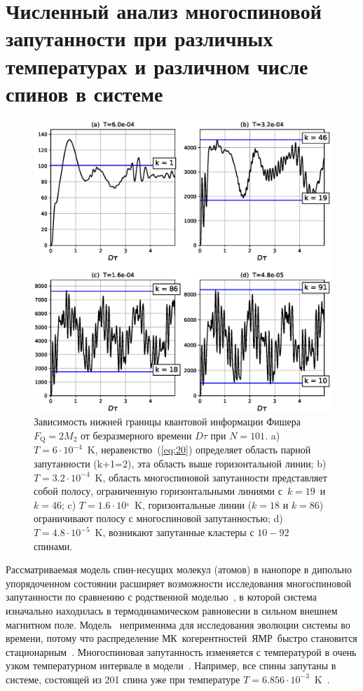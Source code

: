 \documentclass[utf8]{jetp}
\begin{document}
\section{Численный анализ многоспиновой запутанности при различных температурах и различном числе спинов в системе}
\label{sec:5}

\begin{figure}
 	\includegraphics[width=0.95\linewidth]{fisher_low_bound_n101.eps}
	\caption{
	  Зависимость нижней границы  квантовой информации Фишера $F_\mathrm{Q} = 2 M_{2}$
	  от безразмерного времени $D\tau$ при $N=101$.
	  a) $T=6\cdot10^{-4}$~K, неравенство~(\ref{eq:20}) определяет область парной запутанности  (k+1=2), эта область выше горизонтальной линии;
	  b) $T=3.2\cdot10^{-4}$~K, область многоспиновой запутанности представляет собой полосу, ограниченную горизонтальными линиями с~$k=19$~и~$k=46$;
	  c) $T = 1.6\cdot10^{_4}$~K, горизонтальные линии ($k=18$ и $k=86$) ограничивают полосу с многоспиновой запутанностью;
	  d) $T=4.8\cdot10^{-5}$~K, возникают запутанные кластеры с $10-92$ спинами.
	}
	\label{fig:2}
\end{figure}

Рассматриваемая модель спин-несущих молекул (атомов) в нанопоре в дипольно упорядоченном состоянии расширяет возможности исследования многоспиновой запутанности по сравнению с родственной моделью~\cite{Doronin_2019},
в которой система изначально находилась в термодинамическом равновесии в сильном внешнем магнитном поле.
Модель~\cite{Doronin_2019} неприменима для исследования эволюции системы во времени,
потому что распределение МК~когерентностей~ЯМР~быстро становится стационарным~\cite{Doronin_2009}.
Многоспиновая запутанность изменяется с температурой в очень узком температурном интервале в модели~\cite{Doronin_2019}.
Например, все спины запутаны в системе, состоящей из 201 спина уже при температуре $T=6.856\cdot10^{-3}$~K~\cite{Doronin_2019}.
\end{document}
